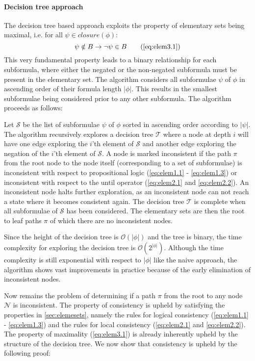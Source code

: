 \paragraph{Decision tree approach}
The decision tree based approach exploits the property of elementary sets being maximal, i.e. for all $\psi \in closure(\phi)$:
\begin{equation*}
  \psi \notin B \imply \lnot \psi \in B \tag{\autoref{eq:elem3.1}}
\end{equation*}
This very fundamental property leads to a binary relationship for each subformula, where either the negated or the non-negated subformula must be present in the elementary set. The algorithm considers all subformulae $\psi$ of $\phi$ in ascending order of their formula length $|\phi|$. This results in the smallest subformulae being considered prior to any other subformula. The algorithm proceeds as follows: 

Let $\mathcal{S}$ be the list of subformulae $\psi$ of $\phi$ sorted in ascending order according to $|\psi|$. The algorithm recursively explores a decision tree $\mathcal{T}$ where a node at depth $i$ will have one edge exploring the $i$'th element of $\mathcal{S}$ and another edge exploring the negation of the $i$'th element of $\mathcal{S}$. A node is marked inconsistent if the path $\pi$ from the root node to the node itself (corresponding to a set of subformulae) is inconsistent with respect to propositional logic (\autoref{eq:elem1.1} - \autoref{eq:elem1.3}) or inconsistent with respect to the until operator (\autoref{eq:elem2.1} and \autoref{eq:elem2.2}). An inconsistent node halts further exploration, as an inconsistent node can not reach a state where it becomes consistent again. The decision tree $\mathcal{T}$ is complete when all subformulae of $\mathcal{S}$ has been considered. The elementary sets are then the root to leaf paths $\pi$ of which there are no inconsistent nodes.

Since the height of the decision tree is $\mathcal{O}(|\phi|)$ and the tree is binary, the time complexity for exploring the decision tree is $\mathcal{O}(2^{|\phi|})$. Although the time complexity is still exponential with respect to $|\phi|$ like the naive approach, the algorithm shows vast improvements in practice because of the early elimination of inconsistent nodes.

Now remains the problem of determining if a path $\pi$ from the root to any node $\mathcal{N}$ is inconsistent. The property of consistency is upheld by satisfying the properties in \autoref{sec:elemesets}, namely the rules for logical consistency (\autoref{eq:elem1.1} - \autoref{eq:elem1.3}) and the rules for local consistency (\autoref{eq:elem2.1} and \autoref{eq:elem2.2}). The property of maximality (\autoref{eq:elem3.1}) is already inherently upheld by the structure of the decision tree. We now show that consistency is upheld by the following proof:

